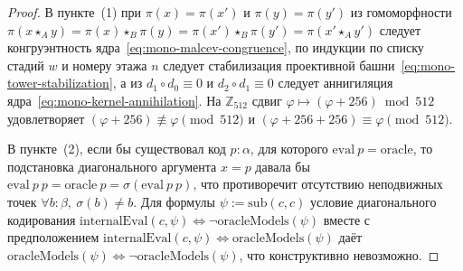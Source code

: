 \begin{proof}
В пункте~(1) при $\pi(x) = \pi(x')$ и $\pi(y) = \pi(y')$ из гомоморфности $\pi(x \star_A y) = \pi(x)\star_B\pi(y) = \pi(x')\star_B\pi(y') = \pi(x' \star_A y')$ следует конгруэнтность ядра~\eqref{eq:mono-malcev-congruence}, по индукции по списку стадий $w$ и номеру этажа $n$ следует стабилизация проективной башни~\eqref{eq:mono-tower-stabilization}, а из $d_1\circ d_0 \equiv 0$ и $d_2\circ d_1 \equiv 0$ следует аннигиляция ядра~\eqref{eq:mono-kernel-annihilation}. На $\mathbb{Z}_{512}$ сдвиг $\varphi \mapsto (\varphi + 256)\bmod 512$ удовлетворяет $(\varphi + 256) \not\equiv \varphi \pmod{512}$ и $(\varphi + 256 + 256) \equiv \varphi \pmod{512}$.

В пункте~(2), если бы существовал код $p : \alpha$, для которого $\mathrm{eval}\ p = \mathrm{oracle}$, то подстановка диагонального аргумента $x = p$ давала бы $\mathrm{eval}\ p\ p = \mathrm{oracle}\ p = \sigma(\mathrm{eval}\ p\ p)$, что противоречит отсутствию неподвижных точек $\forall b:\beta,\ \sigma(b) \ne b$. Для формулы $\psi := \mathrm{sub}(c,c)$ условие диагонального кодирования $\mathrm{internalEval}(c,\psi) \Longleftrightarrow \neg\mathrm{oracleModels}(\psi)$ вместе с предположением $\mathrm{internalEval}(c,\psi) \Longleftrightarrow \mathrm{oracleModels}(\psi)$ даёт $\mathrm{oracleModels}(\psi) \Longleftrightarrow \neg\mathrm{oracleModels}(\psi)$, что конструктивно невозможно.
\end{proof}

